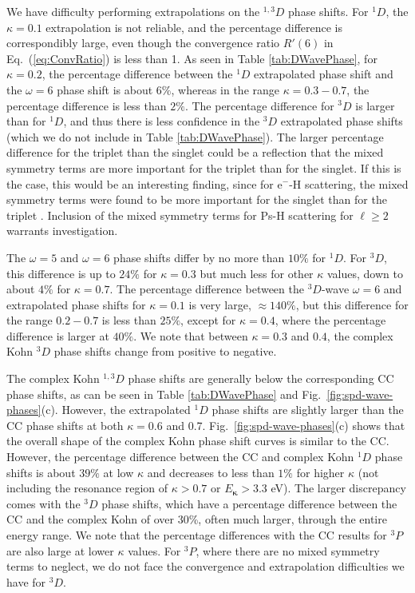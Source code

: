 \documentclass[preprint,showpacs,showkeys,preprintnumbers,amsmath,amssymb,longbibliography,pra,aps]{revtex4-1}
\begin{document}
{We have difficulty performing extrapolations on the $^{1,3}D$ phase shifts.
For $^1D$, the $\kappa = 0.1$ extrapolation is not reliable, and the
percentage difference is correspondibly large, even though the
convergence ratio $R'(6)$ in Eq.~(\ref{eq:ConvRatio}) is less than 1. As seen in Table
\ref{tab:DWavePhase}, for $\kappa = 0.2$, the percentage difference
between the $^1D$ extrapolated phase shift and the $\omega = 6$ 
phase shift is about $6\%$,
whereas in the range $\kappa = 0.3 - 0.7$, the percentage difference is
less than $2\%$. The percentage difference for $^3D$ is larger than for $^1D$,
and thus there is less confidence in the $^3D$ extrapolated phase shifts (which we
do not include in Table \ref{tab:DWavePhase}). The larger percentage
difference for the triplet than the singlet could be a reflection that the
mixed symmetry terms are more important for the
triplet than for the singlet. If this is the case, this would be an interesting
finding, since for e$^-$-H scattering, the mixed symmetry terms were found to
be more important for the singlet than
for the triplet \cite{VanReeth2015}. Inclusion of the mixed symmetry terms for
Ps-H scattering for $\ell \geq 2$ warrants investigation.

The $\omega = 5$ and $\omega = 6$ phase shifts differ by no more than
$10\%$ for $^1D$. For $^3D$, this difference is up to $24\%$ for
$\kappa=0.3$ but much less for other $\kappa$ values, down to
about $4\%$ for $\kappa = 0.7$.
The percentage difference between the $^3D$-wave $\omega = 6$ and extrapolated
phase shifts for $\kappa = 0.1$ is very large,
$\approx 140\%$, but this difference for the range $0.2 - 0.7$
is less than $25\%$, except for $\kappa = 0.4$, where the percentage
difference is larger at $40\%$. We note that between $\kappa = 0.3$
and $0.4$, the complex Kohn $^3D$ phase shifts change from positive 
to negative.

The complex Kohn $^{1,3}D$ phase shifts are generally below the corresponding 
CC phase shifts, as can be seen in Table \ref{tab:DWavePhase} and
Fig.~\ref{fig:spd-wave-phases}(c). However, the extrapolated $^1D$ phase shifts
are slightly larger than the CC phase shifts at both $\kappa = 0.6$ and 0.7.
Fig.~\ref{fig:spd-wave-phases}(c) shows that the overall shape of the complex Kohn 
phase shift curves is similar to the CC. However, the percentage difference 
between the CC and complex Kohn $^1D$ phase shifts is about $39\%$ at low
$\kappa$ and decreases to less than $1\%$ for higher $\kappa$ (not including 
the resonance region of $\kappa > 0.7$ or $E_{ \bm \kappa} > 3.3$ eV). The 
larger discrepancy comes with the $^3D$ phase shifts, which have a percentage 
difference between the CC and the complex Kohn of over 30\%, often much 
larger, through the entire energy range. We note that the percentage 
differences with the CC results for $^3P$ are also large at lower $\kappa$ 
values. For $^3P$, where there are no mixed symmetry terms to neglect,
we do not face the convergence and extrapolation 
difficulties we have for $^3D$.

}
\end{document}

